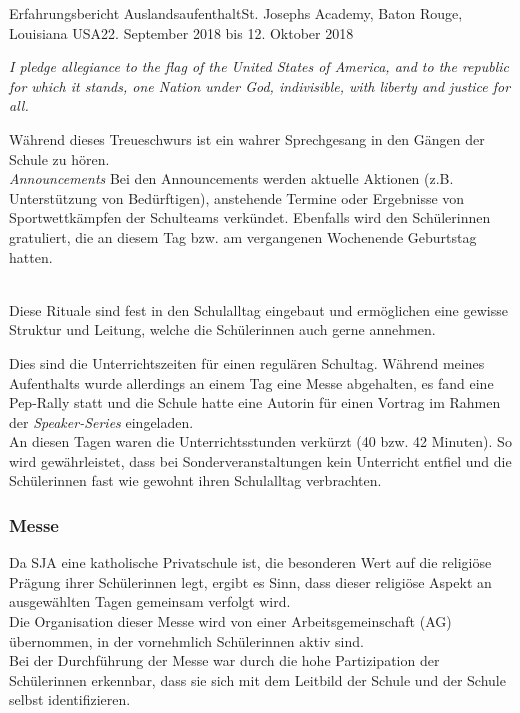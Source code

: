 \documentclass[oneside,openany,headings=optiontotoc,11pt,numbers=noenddot]{article}
\begin{document}
\begin{worksheet}{Erfahrungsbericht Auslandsaufenthalt}{St. Joseph\grq{}s Academy, Baton Rouge, Louisiana USA}{22. September 2018 bis 12. Oktober 2018}
{\begin{center}
\begin{minipage}{0.7\textwidth}
\begin{center}
						\textit{\glqq{}I pledge allegiance to the flag of the United States of America, and to the republic for which it stands, one Nation under God, indivisible, with liberty and justice for all.\grqq{}}
					\end{center}
					\normalsize
				\end{minipage}
			\end{center}	
			Während dieses Treueschwurs ist ein wahrer Sprechgesang in den Gängen der Schule zu hören.\\
			\indent
			\textit{Announcements} Bei den Announcements werden aktuelle Aktionen (z.B. Unterstützung von Bedürftigen), anstehende Termine oder Ergebnisse von Sportwettkämpfen der Schulteams verkündet. Ebenfalls wird den Schülerinnen gratuliert, die an diesem Tag bzw. am vergangenen Wochenende Geburtstag hatten.}\\
		Diese Rituale sind fest in den Schulalltag eingebaut und ermöglichen eine gewisse Struktur und Leitung, welche die Schülerinnen auch gerne annehmen.\\
		\normalsize
		\par\noindent
		Dies sind die Unterrichtszeiten für einen regulären Schultag. Während meines Aufenthalts wurde allerdings an einem Tag eine Messe abgehalten, es fand eine Pep-Rally statt und die Schule hatte eine Autorin für einen Vortrag im Rahmen der \textit{Speaker-Series} eingeladen.\\
		An diesen Tagen waren die Unterrichtsstunden verkürzt (40 bzw. 42 Minuten). So  wird gewährleistet, dass bei Sonderveranstaltungen  kein Unterricht entfiel und die Schülerinnen fast wie gewohnt ihren Schulalltag verbrachten.
		\subsubsection*{Messe}
		Da SJA eine katholische Privatschule ist, die besonderen Wert auf die religiöse Prägung ihrer Schülerinnen legt, ergibt es Sinn, dass dieser religiöse Aspekt an ausgewählten Tagen gemeinsam verfolgt wird.\\
		Die Organisation dieser Messe wird von einer Arbeitsgemeinschaft (AG) übernommen, in der vornehmlich Schülerinnen aktiv sind.\\
		Bei der Durchführung der Messe war durch die hohe Partizipation der Schülerinnen erkennbar, dass sie sich mit dem Leitbild der Schule und der Schule selbst identifizieren.

\end{worksheet}
\end{document}
